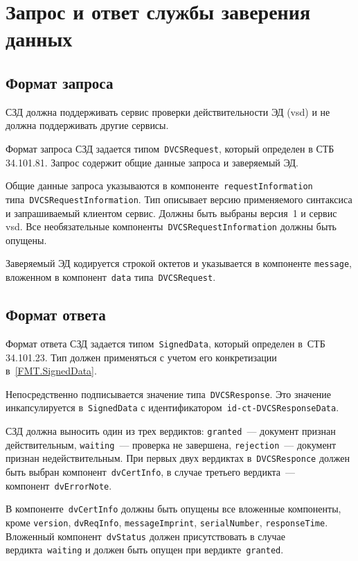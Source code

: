\section{Запрос и ответ службы заверения данных}\label{FMT.DVCS}

\subsection{Формат запроса}\label{FMT.DVCS.Req}

СЗД должна поддерживать сервис проверки действительности ЭД (vsd) и не 
должна поддерживать другие сервисы.

Формат запроса СЗД задается типом~\texttt{DVCSRequest}, который определен  
в СТБ 34.101.81. Запрос содержит общие данные запроса и заверяемый ЭД.

Общие данные запроса указываются в компоненте~\texttt{requestInformation}
типа~\texttt{DVCSRequestInformation}. Тип описывает версию 
применяемого синтаксиса и запрашиваемый клиентом сервис. 
Должны быть выбраны версия~1 и сервис vsd. Все необязательные 
компоненты~\texttt{DVCSRequestInformation} должны быть опущены.

Заверяемый ЭД кодируется строкой октетов 
и указывается в компоненте \texttt{message}, вложенном в 
компонент~\texttt{data} типа~\texttt{DVCSRequest}.

\subsection{Формат ответа}\label{FMT.DVCS.Resp}

Формат ответа СЗД задается типом~\texttt{SignedData}, который определен 
в~СТБ 34.101.23. Тип должен применяться с учетом его конкретизации 
в~\ref{FMT.SignedData}. 
 
Непосредственно подписывается значение типа~\texttt{DVCSResponse}.
Это значение инкапсулируется в~\texttt{SignedData} с 
идентификатором~\texttt{id-ct-DVCSResponseData}.

СЗД должна выносить один из трех вердиктов:
\texttt{granted}~--- документ признан действительным,
\texttt{waiting}~--- проверка не завершена,
\texttt{rejection}~--- документ признан недействительным.
%
При первых двух вердиктах в~\texttt{DVCSResponce}
должен быть выбран компонент~\texttt{dvCertInfo},
в случае третьего вердикта~--- компонент~\texttt{dvErrorNote}.

В компоненте~\texttt{dvCertInfo} должны быть опущены все вложенные 
компоненты, кроме \texttt{version}, \texttt{dvReqInfo}, \texttt{messageImprint}, 
\texttt{serialNumber}, \texttt{responseTime}.
Вложенный компонент~\texttt{dvStatus} должен присутствовать в случае 
вердикта~\texttt{waiting} и должен быть опущен при 
вердикте~\texttt{granted}. 

